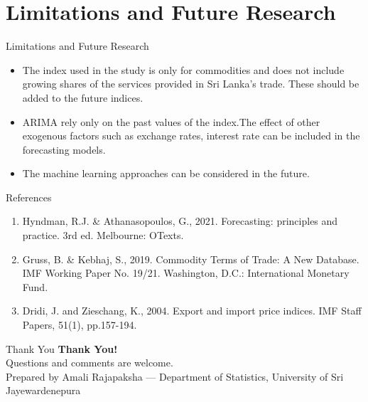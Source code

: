 \documentclass[11pt]{beamer}
\begin{document}
	\section{Limitations and Future Research }
	\begin{frame}{Limitations and Future Research}
		\begin{itemize}
			\item The index used in the study is only for commodities and does not include growing shares
			of the services provided in Sri Lanka’s trade.  These should be added to the future indices.
		\end{itemize}
		\vspace{0.4cm}
		
		\begin{itemize}
			\item ARIMA rely only on the past values of the index.The effect of other exogenous factors such as exchange rates, interest rate can be included in the forecasting models. 
		\end{itemize}
		\vspace{0.4cm}
		
		\begin{itemize}
			\item The machine learning approaches can be considered in the future.
		\end{itemize}
		
	\end{frame}
	
	\begin{frame}{References}
		\begin{enumerate}
			\item Hyndman, R.J. \& Athanasopoulos, G., 2021. Forecasting: principles and practice.
			3rd ed. Melbourne: OTexts.
			\vspace{0.5cm} 
			\item Gruss, B. \& Kebhaj, S., 2019. Commodity Terms of Trade: A New Database. IMF Working Paper No. 19/21. Washington, D.C.: International Monetary Fund.
			\vspace{0.5cm}
			\item Dridi, J. and Zieschang, K., 2004. Export and import price indices. IMF Staff
			Papers, 51(1), pp.157-194.
		\end{enumerate}
	\end{frame}
	
	\begin{frame}{Thank You}
		\centering
		\Large \textbf{Thank You!} \\
		\vspace{0.3cm}
		\normalsize Questions and comments are welcome. \\
		\vfill
		\tiny{Prepared by Amali Rajapaksha — Department of Statistics, University of Sri Jayewardenepura}
	\end{frame}
	
\end{document}

